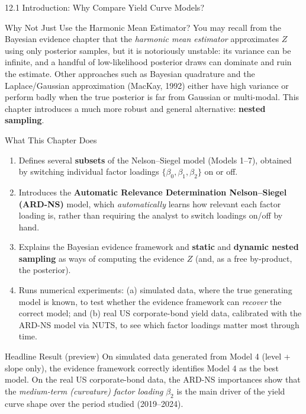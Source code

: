 \documentclass[aspectratio=169,10pt]{beamer}
\begin{document}
\begin{frame}[allowframebreaks]{12.1 Introduction: Why Compare Yield Curve Models?}
\begin{alertblock}{Why Not Just Use the Harmonic Mean Estimator?}
You may recall from the Bayesian evidence chapter that the \emph{harmonic mean estimator} approximates $Z$ using only posterior samples, but it is notoriously unstable: its variance can be infinite, and a handful of low-likelihood posterior draws can dominate and ruin the estimate. Other approaches such as Bayesian quadrature and the Laplace/Gaussian approximation (MacKay, 1992) either have high variance or perform badly when the true posterior is far from Gaussian or multi-modal. This chapter introduces a much more robust and general alternative: \textbf{nested sampling}.
\end{alertblock}

\framebreak

\begin{block}{What This Chapter Does}
\begin{enumerate}
  \item Defines several \textbf{subsets} of the Nelson--Siegel model (Models 1--7), obtained by switching individual factor loadings $\{\beta_0,\beta_1,\beta_2\}$ on or off.
  \item Introduces the \textbf{Automatic Relevance Determination Nelson--Siegel (ARD-NS)} model, which \emph{automatically} learns how relevant each factor loading is, rather than requiring the analyst to switch loadings on/off by hand.
  \item Explains the Bayesian evidence framework and \textbf{static} and \textbf{dynamic nested sampling} as ways of computing the evidence $Z$ (and, as a free by-product, the posterior).
  \item Runs numerical experiments: (a) simulated data, where the true generating model is known, to test whether the evidence framework can \emph{recover} the correct model; and (b) real US corporate-bond yield data, calibrated with the ARD-NS model via NUTS, to see which factor loadings matter most through time.
\end{enumerate}
\end{block}

\begin{exampleblock}{Headline Result (preview)}
On simulated data generated from Model 4 (level + slope only), the evidence framework correctly identifies Model 4 as the best model. On the real US corporate-bond data, the ARD-NS importances show that the \emph{medium-term (curvature) factor loading} $\beta_2$ is the main driver of the yield curve shape over the period studied (2019--2024).
\end{exampleblock}

\end{frame}
\end{document}
